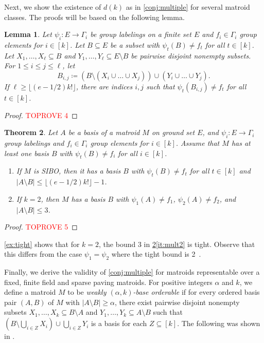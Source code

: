 \documentclass{article}
\newtheorem{theorem}{Theorem}[section]
\newtheorem{lemma}[theorem]{Lemma}
\theoremstyle{definition}
\newcommand{\cups}{\cup\dots\cup}
\begin{document}
Next, we show the existence of $d(k)$ as in \cref{conj:multiple} for several matroid classes. The proofs will be based on the following lemma.

\begin{lemma} \label{lem:multiple}
Let $\psi_i\colon E \to \Gamma_i$ be group labelings on a finite set $E$ and $f_i \in \Gamma_i$ group elements for $i \in [k]$. Let $B \subseteq E$ be a subset with $\psi_t(B) \ne f_t$ for all $t \in [k]$.
Let $X_1, \dots, X_\ell \subseteq B$ and $Y_1, \dots, Y_\ell \subseteq E \setminus B$ be pairwise disjoint nonempty subsets. For $1 \le i \le j \le \ell$, let \[B_{i,j} \coloneqq (B\setminus (X_i \cups X_j)) \cup (Y_i \cups Y_j).\]
If $\ell \ge \lfloor (e-1/2) k!\rfloor$, there are indices $i, j$ such that $\psi_t(B_{i,j}) \ne f_t$ for all $t \in [k]$. 
\end{lemma}
\begin{proof}\textcolor{red}{TOPROVE 4}\end{proof}


\begin{theorem} \label{thm:mult}
Let $A$ be a basis of a matroid $M$ on ground set $E$, and $\psi_i\colon E \to \Gamma_i$ group labelings and $f_i \in \Gamma_i$ group elements for $i \in [k]$.
Assume that $M$ has at least one basis $B$ with $\psi_t(B) \ne f_i$ for all $i \in [k]$.
\begin{enumerate}[label=(\roman*)]
\item If $M$ is SIBO, then it has a basis $B$ with $\psi_t(B) \ne f_t$ for all $t \in [k]$ and $|A\setminus B| \le \lfloor (e-1/2)k!\rfloor-1$. \label{it:multSIBO}
\item If $k=2$, then $M$ has a basis $B$ with $\psi_1(A) \ne f_1$, $\psi_2(A) \ne f_2$, and $|A\setminus B| \le 3$. \label{it:mult2}
\end{enumerate}
\end{theorem}
\begin{proof}\textcolor{red}{TOPROVE 5}\end{proof}

\cref{ex:tight} shows that for $k=2$, the bound 3 in \cref{thm:mult}\ref{it:mult2} is tight. Observe that this differs from the case $\psi_1 = \psi_2$ where the tight bound is 2~\cite{horsch2024problems}.

Finally, we derive the validity of \cref{conj:multiple} for matroids representable over a fixed, finite field and sparse paving matroids.
For positive integers $\alpha$ and $k$, we define a matroid $M$ to be \emph{weakly $(\alpha,k)$-base orderable} if for every ordered basis pair $(A,B)$ of $M$ with $|A\setminus B|\ge \alpha$, there exist pairwise disjoint nonempty subsets $X_1,\dots, X_k \subseteq B \setminus A$ and $Y_1, \dots, Y_k \subseteq A \setminus B$ such that $\left(B \setminus \bigcup_{i\in Z} X_i\right) \cup \bigcup_{i \in Z} Y_i$ is a basis for each $Z \subseteq [k]$. The following was shown in \cite{horsch2024problems}.
\end{document}
